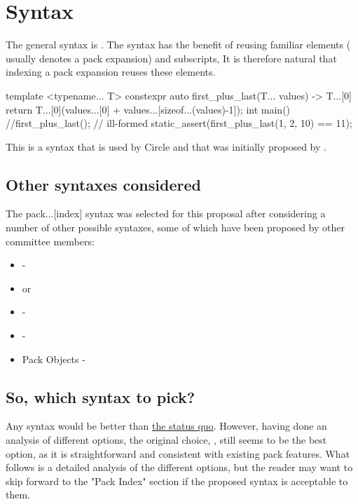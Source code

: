 \documentclass{wg21}
\begin{document}
\section{Syntax}

The general syntax is .
The syntax has the benefit of reusing familiar elements ( usually denotes a pack expansion) and \tcode{[]} subscripts,
It is therefore natural that indexing a pack expansion reuses these elements.

\begin{colorblock}
template <typename... T>
constexpr auto first_plus_last(T... values) ->  T...[0] {
    return T...[0](values...[0] + values...[sizeof...(values)-1]);
}
int main() {
    //first_plus_last(); // ill-formed
    static_assert(first_plus_last(1, 2, 10) == 11);
}
\end{colorblock}

This is a syntax that is used by Circle and that was initially proposed by .

\subsection{Other syntaxes considered}

The pack...[index] syntax was selected for this proposal after considering a
number of other possible syntaxes, some of which have been proposed by other
committee members:

\begin{itemize}
\item {} - 
\item {} or 
\item {} - 
\item {} - 
\item Pack Objects - 
\end{itemize}

\subsection{So, which syntax to pick?}

Any syntax would be better than
\href{https://twitter.com/incomputable/status/1590733659694583808}{the status quo}.
However, having done an analysis of different options, the original choice,
, still seems to be the best option, as it is straightforward
and consistent with existing pack features.  What follows is a detailed
analysis of the different options, but the reader may want to skip forward to
the "Pack Index" section if the proposed syntax is acceptable to them.
\end{document}
